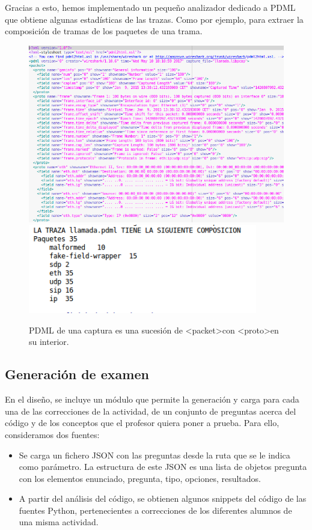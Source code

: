 Gracias a esto, hemos implementado un pequeño analizador dedicado a PDML que obtiene algunas estadísticas de las trazas. Como por ejemplo, para extraer la composición de tramas de los paquetes de una trama.\\

\begin{figure}[H]
   \centering
   \includegraphics[width=16cm]{img/Selection_015_pdml_1}
   \includegraphics[width=10cm]{img/Selection_029_pdml}
   \caption{PDML de una captura es una sucesión de \textless packet\textgreater \space   con \textless proto\textgreater  \space en su interior.}
   \label{figura:pdml}
\end{figure}


\subsection{Generación de examen}

En el diseño, se incluye un módulo que permite la generación y carga para cada una de las correcciones de la actividad, de un conjunto de preguntas acerca del código y de los conceptos que el profesor quiera poner a prueba. Para ello, consideramos dos fuentes:\\

\begin{itemize}
\item Se carga un fichero JSON con las preguntas desde la ruta que se le indica como parámetro. La estructura de este JSON es una lista de objetos pregunta con los elementos enunciado, pregunta, tipo, opciones, resultados.

\item A partir del análisis del código, se obtienen  algunos snippets del código de las fuentes Python, pertenecientes a correcciones de los diferentes alumnos de una misma actividad.\\
\end{itemize}


